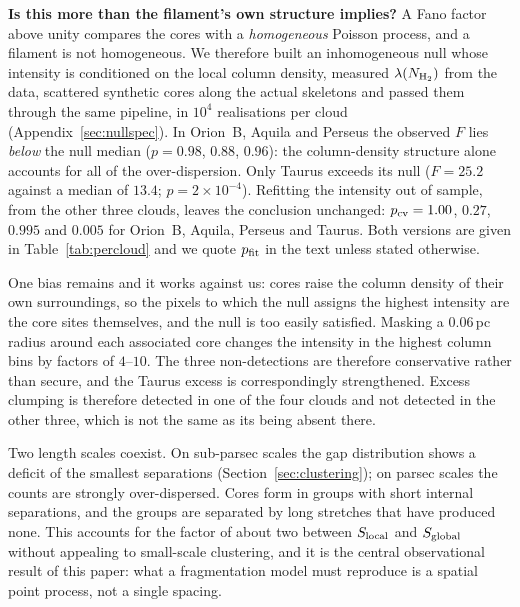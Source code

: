 \documentclass[usenatbib,twoside,twocolumn]{mnras}
\begin{document}
\smallskip\noindent\textbf{Is this more than the filament's own structure implies?} A Fano factor above unity compares the cores with a \emph{homogeneous} Poisson process, and a filament is not homogeneous. We therefore built an inhomogeneous null whose intensity is conditioned on the local column density, measured $\lambda(N_{\rm H_2})$ from the data, scattered synthetic cores along the actual skeletons and passed them through the same pipeline, in $10^4$ realisations per cloud (Appendix~\ref{sec:nullspec}). In Orion~B, Aquila and Perseus the observed $F$ lies \emph{below} the null median ($p=0.98$, $0.88$, $0.96$): the column-density structure alone accounts for all of the over-dispersion. Only Taurus exceeds its null ($F=25.2$ against a median of $13.4$; $p=2\times10^{-4}$). Refitting the intensity out of sample, from the other three clouds, leaves the conclusion unchanged: $p_{\rm cv}=1.00$, $0.27$, $0.995$ and $0.005$ for Orion~B, Aquila, Perseus and Taurus. Both versions are given in Table~\ref{tab:percloud} and we quote $p_{\rm fit}$ in the text unless stated otherwise.

One bias remains and it works against us: cores raise the column density of their own surroundings, so the pixels to which the null assigns the highest intensity are the core sites themselves, and the null is too easily satisfied. Masking a $0.06$\,pc radius around each associated core changes the intensity in the highest column bins by factors of $4$--$10$. The three non-detections are therefore conservative rather than secure, and the Taurus excess is correspondingly strengthened. Excess clumping is therefore detected in one of the four clouds and not detected in the other three, which is not the same as its being absent there.

Two length scales coexist. On sub-parsec scales the gap distribution shows a deficit of the smallest separations (Section~\ref{sec:clustering}); on parsec scales the counts are strongly over-dispersed. Cores form in groups with short internal separations, and the groups are separated by long stretches that have produced none. This accounts for the factor of about two between $S_{\rm local}$ and $S_{\rm global}$ without appealing to small-scale clustering, and it is the central observational result of this paper: what a fragmentation model must reproduce is a spatial point process, not a single spacing.
\end{document}

